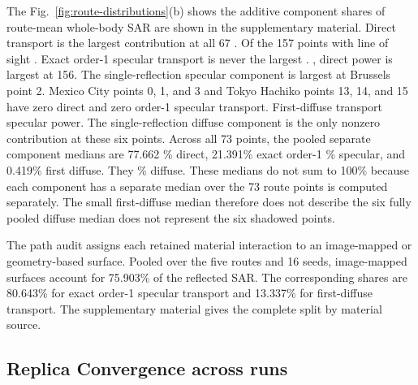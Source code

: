 \documentclass{IEEEoj} %
\providecommand{\DIFadd}[1]{{\protect\color{blue} \sf #1}} %
\providecommand{\DIFdel}[1]{{\protect\color{red} \scriptsize #1}} %
\providecommand{\DIFaddbegin}{} %
\providecommand{\DIFaddend}{} %
\providecommand{\DIFdelbegin}{} %
\providecommand{\DIFdelend}{} %
\begin{document}
\DIFdelbegin \DIFdel{The }\DIFdelend %
\DIFaddbegin \DIFadd{Fig.~\ref{fig:route-distributions}(b) shows the }\DIFaddend additive component shares\DIFdelbegin \DIFdel{of route-mean whole-body SAR are shown in the
supplementary material. Direct transport is the largest
contribution at all 67 }\DIFdelend \DIFaddbegin \DIFadd{. Of
the 157 }\DIFaddend points with line of sight\DIFdelbegin \DIFdel{. Exact order-1 specular transport is never the largest . }\DIFdelend \DIFaddbegin \DIFadd{, direct power is largest at 156. The
single-reflection specular component is largest at Brussels point 2. }\DIFaddend Mexico City
points 0, 1, and 3 and Tokyo Hachiko points 13, 14, and 15 have zero direct and
zero \DIFdelbegin \DIFdel{order-1 specular transport. First-diffuse transport }\DIFdelend \DIFaddbegin \DIFadd{specular power. The single-reflection diffuse component }\DIFaddend is the only
nonzero contribution at these six points. Across all \DIFdelbegin \DIFdel{73 }\DIFdelend \DIFaddbegin \DIFadd{163 }\DIFaddend points, the \DIFdelbegin \DIFdel{pooled }\DIFdelend \DIFaddbegin \DIFadd{separate
}\DIFaddend component medians are \DIFdelbegin \DIFdel{77.662}\DIFdelend \DIFaddbegin \DIFadd{78}\DIFaddend \% direct, \DIFdelbegin \DIFdel{21.391\% exact order-1 }\DIFdelend \DIFaddbegin \DIFadd{20\% }\DIFaddend specular, and \DIFdelbegin \DIFdel{0.419\% first diffuse. They }\DIFdelend \DIFaddbegin \DIFadd{0.5\% diffuse. These
medians }\DIFaddend do not sum to 100\% because each \DIFdelbegin \DIFdel{component has a separate median over the 73 route points}\DIFdelend \DIFaddbegin \DIFadd{is computed separately}\DIFaddend . The small
\DIFdelbegin \DIFdel{first-diffuse median therefore does not describe the six fully }\DIFdelend \DIFaddbegin \DIFadd{pooled diffuse median does not represent the six }\DIFaddend shadowed points.

\DIFdelbegin \DIFdel{The path audit assigns each retained material interaction to an image-mapped or
geometry-based surface. Pooled over the five routes and 16 seeds, image-mapped
surfaces account for 75.903\% of the reflected SAR. The
corresponding shares are 80.643\% for exact order-1 specular transport and
13.337\% for first-diffuse transport. The supplementary material gives the
complete split by material source.
}%

\DIFdelend \subsection{\DIFdelbegin \DIFdel{Replica }\DIFdelend Convergence \DIFaddbegin \DIFadd{across runs}\DIFaddend }
\label{sec:convergence}
\end{document}
